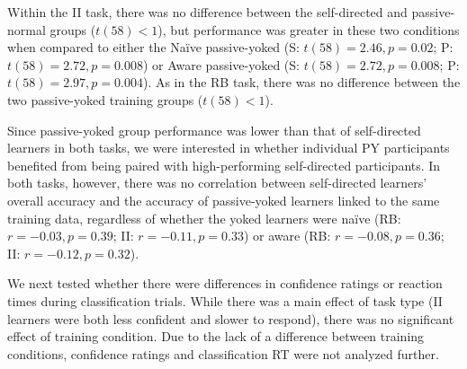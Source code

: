 \documentclass[3p,twocolumn,authoryear,10pt]{elsarticle}
\begin{document}
Within the II task, there was no difference between the self-directed and passive-normal groups ($t(58)<1$), but performance was greater in these two conditions when compared to either the Na\"{i}ve passive-yoked (S: $t(58)=2.46, p=0.02$; P: $t(58)=2.72, p=0.008$) or Aware passive-yoked (S: $t(58)=2.72, p=0.008$; P: $t(58)=2.97, p=0.004$). As in the RB task, there was no difference between the two passive-yoked training groups ($t(58)<1$).

Since passive-yoked group performance was lower than that of self-directed learners in both tasks, we were interested in whether individual PY participants benefited from being paired with high-performing self-directed participants. In both tasks, however, there was no correlation between self-directed learners' overall accuracy and the accuracy of passive-yoked learners linked to the same training data, regardless of whether the yoked learners were na\"{i}ve (RB: $r=-0.03, p=0.39$; II: $r=-0.11, p=0.33$) or aware (RB: $r=-0.08, p=0.36$; II: $r=-0.12, p=0.32$).

%


We next tested whether there were differences in confidence ratings or reaction times during classification trials. 
While there was a main effect of task type (II learners were both less confident and slower to respond), there was 
no significant effect of training condition. Due to the lack of a difference between training conditions, confidence ratings and classification RT were not analyzed further.


\end{document}
